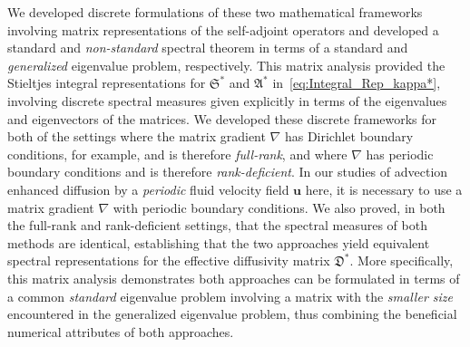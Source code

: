 \documentclass[english,12pt,jmp,graphicx]{revtex4-1}
\newcommand{\vecu}{\boldsymbol{u}}
\newcommand{\thmref}[1]{Theorem~\ref{#1}}
\newcommand{\secref}[1]{Section~\ref{#1}}
\newcommand{\appref}[1]{Appendix~\ref{#1}}
\newcommand{\Sg}{\mathfrak{S}}
\newcommand{\Ag}{\mathfrak{A}}
\newcommand{\Dg}{\mathfrak{D}}
\begin{document}
We developed discrete formulations of these two mathematical frameworks
involving matrix representations of the self-adjoint operators and
developed a standard and \emph{non-standard} spectral theorem in terms
of a standard and \emph{generalized} eigenvalue problem, respectively.
This matrix analysis provided the Stieltjes integral representations
for $\Sg^*$ and $\Ag^*$ in~\eqref{eq:Integral_Rep_kappa*}, involving
discrete spectral measures given explicitly in terms of the
eigenvalues and eigenvectors of the matrices.
We developed these discrete frameworks for both of the settings where the 
matrix gradient $\nabla$ has Dirichlet boundary conditions, for example, and is
therefore \emph{full-rank}, and where $\nabla$ has periodic boundary
conditions and is therefore \emph{rank-deficient}. In our studies of
advection enhanced diffusion by a \emph{periodic} fluid velocity field
$\vecu$ here, it is necessary to use a matrix gradient $\nabla$ with periodic
boundary conditions.
We also proved, in both the full-rank and rank-deficient settings,
that the spectral measures of both methods are identical, establishing
that the two approaches yield equivalent spectral representations for
the effective diffusivity matrix $\Dg^*$. More specifically, this
matrix analysis demonstrates both approaches can be formulated in
terms of a common \emph{standard} eigenvalue problem involving a
matrix with the \emph{smaller size} encountered in the generalized
eigenvalue problem, thus combining the beneficial numerical attributes
of both approaches. 
\end{document}
